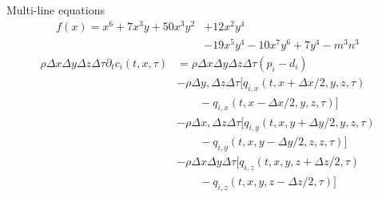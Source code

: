 \documentclass{beamer}
\begin{document}
\begin{frame}{Multi-line equations}%
\transblindshorizontal%
\begin{align*}%
    f(x) = x^6 + 7x^3y + 50x^3y^2 & + 12x^2y^4 \\
                                  &- 19x^5y^4 - 10x^7y^6 + 7y^4 - m^3n^3
\end{align*}
\vspace{-5mm}
\begin{align*}%
\rho \Delta x \Delta y \Delta z \Delta \tau \partial_t c_i(t,x,\tau) 
&= \rho \Delta x \Delta y \Delta z \Delta \tau (p_i-d_i)  \\
&- \rho \Delta y, \Delta z \Delta \tau [q_{i,x}(t,x+\Delta x/2, y, z, \tau)\\
&\qquad - q_{i,x}(t,x - \Delta x/2, y, z, \tau)]\\
&- \rho \Delta x, \Delta z \Delta  \tau [q_{i,y}(t,x,y+\Delta y/2, y, z, \tau)\\
&\qquad - q_{i,y}(t,x,y - \Delta y/2, z, z, \tau)]\\
&- \rho \Delta x \Delta y \Delta \tau[q_{i,z}(t,x,y,z+\Delta z/2, \tau) \\
&\qquad - q_{i,z}(t,x,y,z-\Delta z/2, \tau)]
\end{align*}

\end{frame}
\end{document}
